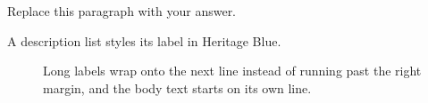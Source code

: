 
Replace this paragraph with your answer.

\begin{description}
  \item[A description list styles its label in Heritage Blue.]
    Long labels wrap onto the next line instead of running past the
    right margin, and the body text starts on its own line.
\end{description}
